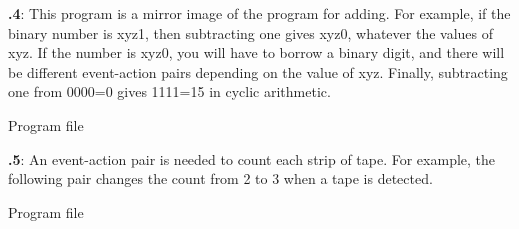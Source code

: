 \documentclass[12pt,a4paper,english]{article}
\begin{document}
\textbf{\thesection.4}:
This program is a mirror image of the program for adding.
For example, if the binary number is xyz1,
then subtracting one gives xyz0, whatever the values of xyz.
If the number is xyz0, you will have to borrow a binary digit,
and there will be different event-action pairs depending on the value
of xyz. Finally, subtracting one from 0000=0 gives 1111=15 in cyclic
arithmetic.

{\raggedleft \hfill Program file }

\textbf{\thesection.5}:
An event-action pair is needed to count each strip of tape.
For example, the following pair  changes the count from 2 to 3 when a tape is detected.

{\raggedleft \hfill Program file }
\end{document}
